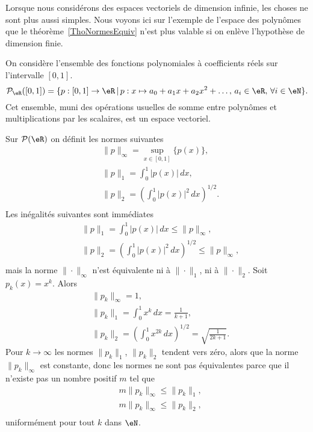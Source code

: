 Lorsque nous considérons des espaces vectoriels de dimension infinie, les choses ne sont plus aussi simples. Nous voyons ici sur l'exemple de l'espace des polynômes que le théorème~\ref{ThoNormesEquiv} n'est plus valable si on enlève l'hypothèse de dimension finie.

On considère l'ensemble des fonctions polynomiales à coefficients réels sur  l'intervalle \( [0,1]\).
\begin{equation}
	\mathcal{P}_\eR([0,1])=\{p:[0,1]\to \eR\,|\, p : x\mapsto a_0+a_1 x +a_2 x^2 + \ldots, \, a_i\in\eR,\,\forall i\in \eN\}.
\end{equation}
Cet ensemble, muni des opérations usuelles de somme entre polynômes et multiplications par les scalaires, est un espace vectoriel.

Sur \( \mathcal{P}(\eR)\) on définit les normes suivantes
\begin{equation}
	\begin{aligned}
		 & \|p\|_\infty=\sup_{x\in[0,1]}\{p(x)\},             \\
		 & \|p\|_1 =\int_0^1|p(x)|\, dx,                      \\
		 & \|p\|_2 =\left(\int_0^1|p(x)|^2\, dx\right)^{1/2}. \\
	\end{aligned}
\end{equation}
Les inégalités suivantes sont  immédiates
\begin{equation}
	\begin{aligned}
		 & \|p\|_1 =\int_0^1|p(x)|\, dx\leq \|p\|_\infty,                      \\
		 & \|p\|_2 =\left(\int_0^1|p(x)|^2\, dx\right)^{1/2}\leq \|p\|_\infty, \\
	\end{aligned}
\end{equation}
mais la norme \( \|\cdot\|_\infty\) n'est  équivalente ni à \( \|\cdot\|_1\), ni à \( \|\cdot\|_2\). Soit \( p_k(x)= x^k\). Alors
\begin{equation}
	\begin{aligned}
		 & \|p_k\|_\infty=1,                                                        \\
		 & \|p_k\|_1 =\int_0^1x^k\, dx=  \frac{1}{k+1},                             \\
		 & \|p_k\|_2 =\left(\int_0^1x^{2k}\, dx\right)^{1/2}=\sqrt{\frac{1}{2k+1}}.
	\end{aligned}
\end{equation}
Pour \( k\to \infty\) les normes \( \|p_k\|_1\), \( \|p_k\|_2\) tendent vers zéro, alors que la norme \( \|p_k\|_\infty\) est constante, donc les normes ne sont pas équivalentes parce que il n'existe pas un nombre positif \( m\) tel que
\begin{equation}
	\begin{aligned}
		 & m \|p_k\|_\infty\leq \|p_k\|_1 , \\
		 & m \|p_k\|_\infty\leq \|p_k\|_2 , \\
	\end{aligned}
\end{equation}
uniformément pour tout \( k\) dans \( \eN\).

